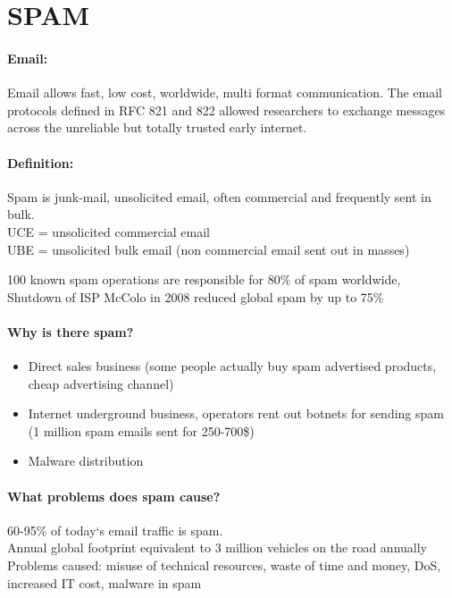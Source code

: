 \section{SPAM}

\paragraph{Email:} Email allows fast, low cost, worldwide, multi format communication. The email protocols defined in RFC 821 and 822 allowed researchers to exchange messages across the unreliable but totally trusted early internet.

\paragraph{Definition:} Spam is junk-mail, unsolicited email, often commercial and frequently sent in bulk.\\
UCE = unsolicited commercial email \\
UBE = unsolicited bulk email (non commercial email sent out in masses)

100 known spam operations are responsible for 80\% of spam worldwide, Shutdown of ISP McColo in 2008 reduced global spam by up to 75\%

\paragraph{Why is there spam?}
\begin{itemize}
\item Direct sales business (some people actually buy spam advertised products, cheap advertising channel)
\item Internet underground business, operators rent out botnets for sending spam (1 million spam emails sent for 250-700\$)
\item Malware distribution
\end{itemize}

\paragraph{What problems does spam cause?} 60-95\% of today‘s email traffic is spam. \\
Annual global footprint equivalent to 3 million vehicles on the road annually \\
Problems caused: misuse of technical resources, waste of time and money, DoS, increased IT cost, malware in spam

